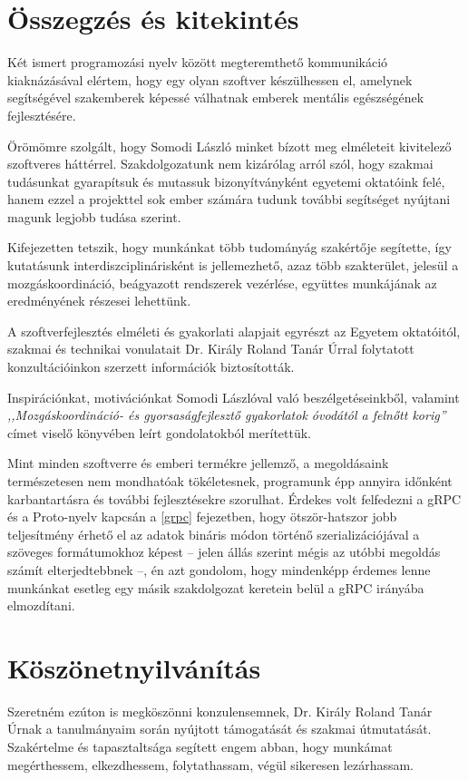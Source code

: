 \documentclass[tocnopagenum]{thesis-ekf}
\theoremstyle{definition}
\theoremstyle{remark}
\begin{document}
	\chapter*{Összegzés és kitekintés}
	Két ismert programozási nyelv között megteremthető kommunikáció kiaknázásával elértem, hogy egy olyan szoftver készülhessen el, amelynek segítségével szakemberek képessé válhatnak emberek mentális egészségének fejlesztésére. 
	
	Örömömre szolgált, hogy Somodi László minket bízott meg elméleteit kivitelező szoftveres háttérrel. Szakdolgozatunk nem kizárólag arról szól, hogy szakmai tudásunkat gyarapítsuk és mutassuk bizonyítványként egyetemi oktatóink felé, hanem ezzel a projekttel sok ember számára tudunk további segítséget nyújtani magunk legjobb tudása szerint.
	
	Kifejezetten tetszik, hogy munkánkat több tudományág szakértője segítette, így kutatásunk interdiszciplinárisként is jellemezhető, azaz több szakterület, jelesül a mozgáskoordináció, beágyazott rendszerek vezérlése, együttes munkájának az eredményének részesei lehettünk.
	
	A szoftverfejlesztés elméleti és gyakorlati alapjait egyrészt az Egyetem oktatóitól, szakmai és technikai vonulatait Dr. Király Roland Tanár Úrral folytatott konzultációinkon szerzett információk biztosították. 
	
	Inspirációnkat, motivációnkat Somodi Lászlóval való beszélgetéseinkből, valamint \textit{,,Mozgáskoordináció- és gyorsaságfejlesztő gyakorlatok óvodától a felnőtt korig''} címet viselő könyvében leírt gondolatokból merítettük.
	
	Mint minden szoftverre és emberi termékre jellemző, a megoldásaink természetesen nem mondhatóak tökéletesnek, programunk épp annyira időnként karbantartásra és további fejlesztésekre szorulhat. Érdekes volt felfedezni a gRPC és a Proto-nyelv kapcsán a \ref{grpc} fejezetben, hogy ötször-hatszor jobb teljesítmény érhető el az adatok bináris módon történő szerializációjával a szöveges formátumokhoz képest -- jelen állás szerint mégis az utóbbi megoldás számít elterjedtebbnek --, én azt gondolom, hogy mindenképp érdemes lenne munkánkat esetleg egy másik szakdolgozat keretein belül a gRPC irányába elmozdítani.
	\chapter*{Köszönetnyilvánítás}
	Szeretném ezúton is megköszönni konzulensemnek, Dr. Király Roland Tanár Úrnak a tanulmányaim során nyújtott támogatását és szakmai útmutatását. Szakértelme és tapasztaltsága segített engem abban, hogy munkámat megérthessem, elkezdhessem, folytathassam, végül sikeresen lezárhassam.
	
\end{document}
